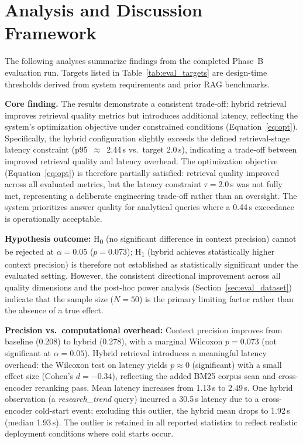 \section{Analysis and Discussion Framework}
\label{sec:discussion}

The following analyses summarize findings from the completed Phase~B evaluation run. Targets listed in Table~\ref{tab:eval_targets} are design-time thresholds derived from system requirements and prior RAG benchmarks.

\noindent\textbf{Core finding.} The results demonstrate a consistent trade-off: hybrid retrieval improves retrieval quality metrics but introduces additional latency, reflecting the system's optimization objective under constrained conditions (Equation~\ref{eq:opt}). Specifically, the hybrid configuration slightly exceeds the defined retrieval-stage latency constraint (p95~$\approx$~2.44\,s vs.\ target 2.0\,s), indicating a trade-off between improved retrieval quality and latency overhead. The optimization objective (Equation~\ref{eq:opt}) is therefore partially satisfied: retrieval quality improved across all evaluated metrics, but the latency constraint $\tau = 2.0$\,s was not fully met, representing a deliberate engineering trade-off rather than an oversight. The system prioritizes answer quality for analytical queries where a 0.44\,s exceedance is operationally acceptable.

\textbf{Hypothesis outcome:} H\textsubscript{0} (no significant difference in context precision) cannot be rejected at $\alpha = 0.05$ ($p = 0.073$); H\textsubscript{1} (hybrid achieves statistically higher context precision) is therefore not established as statistically significant under the evaluated setting. However, the consistent directional improvement across all quality dimensions and the post-hoc power analysis (Section~\ref{sec:eval_dataset}) indicate that the sample size ($N = 50$) is the primary limiting factor rather than the absence of a true effect.

\textbf{Precision vs.\ computational overhead:} Context precision improves from baseline (0.208) to hybrid (0.278), with a marginal Wilcoxon $p = 0.073$ (not significant at $\alpha = 0.05$). Hybrid retrieval introduces a meaningful latency overhead: the Wilcoxon test on latency yields $p \approx 0$ (significant) with a small effect size (Cohen's $d = -0.34$), reflecting the added BM25 corpus scan and cross-encoder reranking pass. Mean latency increases from 1.13\,s to 2.49\,s. One hybrid observation (a \textit{research\_trend} query) incurred a 30.5\,s latency due to a cross-encoder cold-start event; excluding this outlier, the hybrid mean drops to 1.92\,s (median 1.93\,s). The outlier is retained in all reported statistics to reflect realistic deployment conditions where cold starts occur.

